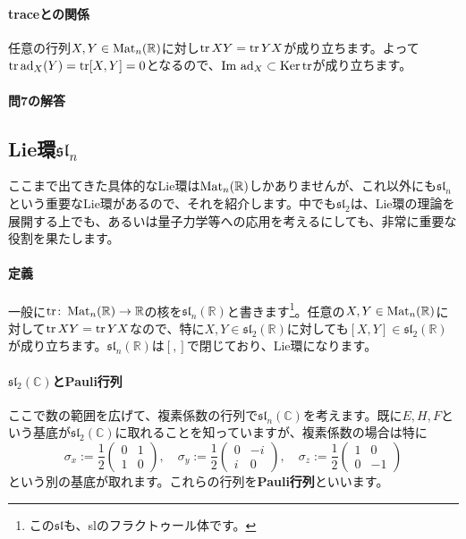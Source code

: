 \paragraph{traceとの関係} 任意の行列$X, Y \in \operatorname{Mat}_n(\mathbb{R})$に対し$\operatorname{tr} XY = \operatorname{tr} YX$が成り立ちます。よって$\operatorname{tr} \operatorname{ad}_X(Y) = \operatorname{tr} [X, Y] = 0$となるので、$\mathrm{Im}\, \operatorname{ad}_X \subset \operatorname{Ker} \operatorname{tr}$が成り立ちます。

\paragraph{問7の解答}

\subsection{Lie環$\mathfrak{sl}_n$}

ここまで出てきた具体的なLie環は$\operatorname{Mat}_n(\mathbb{R})$しかありませんが、これ以外にも$\mathfrak{sl}_n$という重要なLie環があるので、それを紹介します。中でも$\mathfrak{sl}_2$は、Lie環の理論を展開する上でも、あるいは量子力学等への応用を考えるにしても、非常に重要な役割を果たします。

\paragraph{定義}

一般に$\operatorname{tr}\colon \operatorname{Mat}_n(\mathbb{R}) \rightarrow \mathbb{R}$の核を$\mathfrak{sl}_n(\mathbb{R})$と書きます\footnote{この$\mathfrak{sl}$も、slのフラクトゥール体です。}。任意の$X, Y \in \operatorname{Mat}_n(\mathbb{R})$に対して$\operatorname{tr} XY = \operatorname{tr} YX$なので、特に$X, Y\in\mathfrak{sl}_2(\mathbb{R})$に対しても$[X, Y] \in \mathfrak{sl}_2(\mathbb{R})$が成り立ちます。$\mathfrak{sl}_n(\mathbb{R})$は$[, ]$で閉じており、Lie環になります。

\paragraph{$\mathfrak{sl}_2(\mathbb{C})$とPauli行列}

ここで数の範囲を広げて、複素係数の行列で$\mathfrak{sl}_n(\mathbb{C})$を考えます。既に$E, H, F$という基底が$\mathfrak{sl}_2(\mathbb{C})$に取れることを知っていますが、複素係数の場合は特に
\[
\sigma_x := 
\frac{1}{2}
\begin{pmatrix}
0 & 1 \\
1 & 0
\end{pmatrix}, \quad
\sigma_y := 
\frac{1}{2}
\begin{pmatrix}
0 & -i \\
i & 0 
\end{pmatrix}, \quad
\sigma_z := 
\frac{1}{2}
\begin{pmatrix}
1 & 0 \\
0 & -1
\end{pmatrix}
\]
という別の基底が取れます。これらの行列を\textbf{Pauli行列}といいます。

